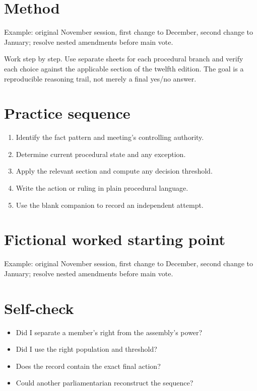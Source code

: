 \documentclass[11pt]{article}
\begin{document}
\SuiteOpen
\section{Method}
Example: original November session, first change to December, second change to January; resolve nested amendments before main vote.

Work step by step. Use separate sheets for each procedural branch and verify each choice against the applicable section of the twelfth edition. The goal is a reproducible reasoning trail, not merely a final yes/no answer.

\section{Practice sequence}
\begin{enumerate}[leftmargin=*,itemsep=4pt]
\item Identify the fact pattern and meeting’s controlling authority.
\item Determine current procedural state and any exception.
\item Apply the relevant section and compute any decision threshold.
\item Write the action or ruling in plain procedural language.
\item Use the blank companion to record an independent attempt.
\end{enumerate}

\section{Fictional worked starting point}
Example: original November session, first change to December, second change to January; resolve nested amendments before main vote.

\section{Self-check}
\begin{itemize}[leftmargin=*,itemsep=4pt]
\item Did I separate a member’s right from the assembly’s power?
\item Did I use the right population and threshold?
\item Does the record contain the exact final action?
\item Could another parliamentarian reconstruct the sequence?
\end{itemize}
\end{document}
